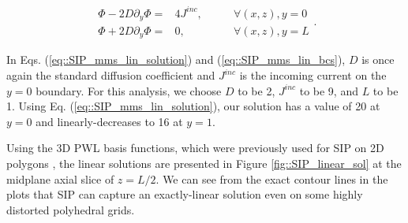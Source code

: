 \begin{equation}
\label{eq::SIP_mms_lin_bcs}
\begin{aligned}
\Phi - 2D \partial_y \Phi = & 4 J^{inc}, \qquad & \forall (x,z),y=0 \\
\Phi + 2D \partial_y \Phi = & 0, \qquad & \forall (x,z),y=L
\end{aligned}.
\end{equation}

\noindent In Eqs. (\ref{eq::SIP_mms_lin_solution}) and (\ref{eq::SIP_mms_lin_bcs}), $D$ is once again the standard diffusion coefficient and $J^{inc}$ is the incoming current on the $y=0$ boundary. For this analysis, we choose $D$ to be 2, $J^{inc}$ to be 9, and $L$ to be 1. Using Eq. (\ref{eq::SIP_mms_lin_solution}), our solution has a value of 20 at $y=0$ and linearly-decreases to 16 at $y=1$.

Using the 3D PWL basis functions, which were previously used for SIP on 2D polygons \cite{ragusa2015discontinuous}, the linear solutions are presented in Figure \ref{fig::SIP_linear_sol} at the midplane axial slice of $z=L/2$. We can see from the exact contour lines in the plots that SIP can capture an exactly-linear solution even on some highly distorted polyhedral grids.

